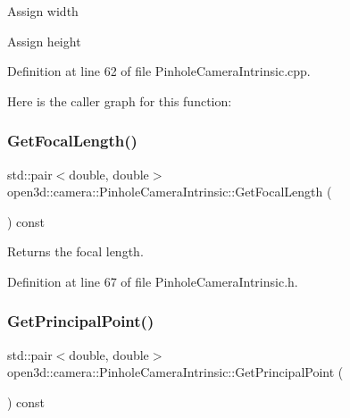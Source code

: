 Assign width

Assign height 

Definition at line 62 of file Pinhole\+Camera\+Intrinsic.\+cpp.

Here is the caller graph for this function\+:
\mbox{\label{classopen3d_1_1camera_1_1_pinhole_camera_intrinsic_a2964f615d4d877b93287fe6abb3fa630}} 
\subsubsection{\texorpdfstring{GetFocalLength()}{GetFocalLength()}}
{\footnotesize\ttfamily std\+::pair$<$double, double$>$ open3d\+::camera\+::\+Pinhole\+Camera\+Intrinsic\+::\+Get\+Focal\+Length (\begin{DoxyParamCaption}{ }\end{DoxyParamCaption}) const\hspace{0.3cm}{\ttfamily [inline]}}



Returns the focal length. 



Definition at line 67 of file Pinhole\+Camera\+Intrinsic.\+h.

\mbox{\label{classopen3d_1_1camera_1_1_pinhole_camera_intrinsic_a029da5bae0d1785f347583bc544f2ae8}} 
\subsubsection{\texorpdfstring{GetPrincipalPoint()}{GetPrincipalPoint()}}
{\footnotesize\ttfamily std\+::pair$<$double, double$>$ open3d\+::camera\+::\+Pinhole\+Camera\+Intrinsic\+::\+Get\+Principal\+Point (\begin{DoxyParamCaption}{ }\end{DoxyParamCaption}) const\hspace{0.3cm}{\ttfamily [inline]}}



